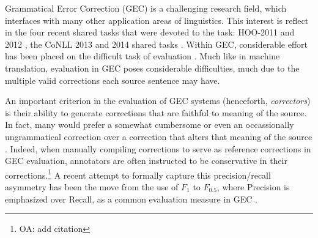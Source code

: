 \documentclass[english]{article}
\newcommand{\oa}[1]{\footnote{\color{red}OA: #1}}
\begin{document}



Grammatical Error Correction (GEC) is a challenging research field, which interfaces with many other application areas of linguistics. This interest is reflect in the four recent shared tasks that were devoted to the task: HOO-2011 and 2012 \cite{dale2011helping,dale2012hoo}, the CoNLL 2013 and 2014
shared tasks \cite{kao2013conll,ng2014conll}.
Within GEC, considerable effort has been placed on the difficult task of
evaluation \cite{tetreault2008native,madnani2011they,chodorow2012problems,dahlmeier2012better}.
Much like in machine translation, evaluation in GEC poses considerable difficulties, much
due to the multiple valid corrections each source sentence may have.

An important criterion in the evaluation of GEC systems (henceforth, {\it correctors}) is their ability to
generate corrections that are faithful to meaning of the source. In fact, many would prefer
a somewhat cumbersome or even an occassionally ungrammatical correction over a correction
that alters that meaning of the source \citet{brockett2006correcting}.
Indeed, when manually compiling corrections to serve as reference corrections in GEC evaluation,
annotators are often instructed to be conservative in their corrections.\oa{add citation}
A recent attempt to formally capture this precision/recall asymmetry has been the move from the use of $F_1$
to $F_{0.5}$, where Precision is emphasized over Recall, as a common evaluation measure
in GEC \cite{dahlmeier2012better}.
\end{document}
